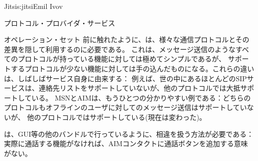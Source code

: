 \begin{aosachapter}{Jitsi}{s:jitsi}{Emil Ivov}
\begin{aosasect1}{プロトコル・プロバイダ・サービス}
\begin{aosasect2}{オペレーション・セット}
前に触れたように、は、様々な通信プロトコルとその差異を隠して利用するのに必要である。
これは、メッセージ送信のようなすべてのプロトコルが持っている機能に対しては極めてシンプルであるが、
サポートするプロトコルが少ない機能に対しては手の込んだものになる。これらの違いは、しばしばサービス自身に由来する：
例えば、世の中にあるほとんどのSIPサービスは、連絡先リストをサポートしていないが、他のプロトコルでは大抵サポートしている。
MSNとAIMは、もうひとつの分かりやすい例である：どちらのプロトコルもオフラインのユーザに対してのメッセージ送信はサポートしていないが、
他のプロトコルではサポートしている(現在は変わった)。

は、GUI等の他のバンドルで行っているように、相違を扱う方法が必要である：
実際に通話する機能がなければ、AIMコンタクトに通話ボタンを追加する意味がない。


\end{aosasect2}
\end{aosasect1}
\end{aosachapter}
